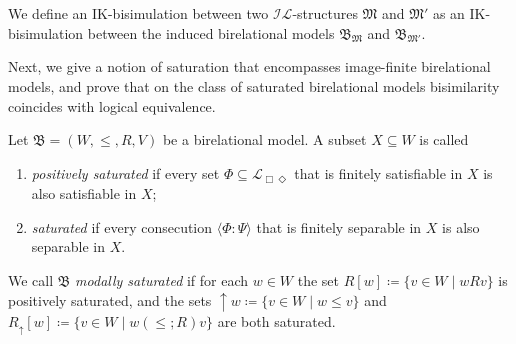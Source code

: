 \documentclass[submission,copyright,creativecommons]{eptcs}
\newcommand{\mo}{\mathfrak}
\newcommand{\B}{\mo{B}}
\newcommand{\ac}{R}
\newcommand{\IL}{\mathscr{I\!\!L}}   %
\newcommand{\ML}{\mathcal{L}_{\Box\Diamond}}        %
\newcommand{\consec}[2]{\langle #1:#2 \rangle}
\begin{document}
\begin{definition}
  We define an IK-bi\-si\-mu\-la\-tion between two $\IL$-structures $\mo{M}$ and $\mo{M}'$
  as an IK-bi\-si\-mu\-la\-tion between the induced birelational models $\B_{\mo{M}}$ and $\B_{\mo{M}'}$.
\end{definition}

  Next, we give a notion of saturation that encompasses image-finite birelational
  models, and prove that on the class of saturated birelational models
  bisimilarity coincides with logical equivalence.

\begin{definition}\label{def:mod-sat}
  Let $\B = (W, \leq, \ac, V)$ be a birelational model.
  A subset $X \subseteq W$ is called
  \begin{enumerate}
    \item \emph{positively saturated} if every set $\Phi \subseteq \ML$ that is finitely satisfiable in $X$ is also satisfiable in $X$;
    \item \emph{saturated} if every consecution $\consec{\Phi}{\Psi}$ that is finitely separable in $X$ is also separable in $X$. 
  \end{enumerate}
%
  We call $\B$
  \emph{modally saturated} if for each $w \in W$ the set
  $R[w] \coloneq \{ v \in W \mid wRv \}$ is positively saturated,
  and the sets ${\uparrow}w \coloneq \{ v \in W \mid w \leq v \}$
  and $R_{\uparrow}[w] \coloneq \{ v \in W \mid w ({\leq} \mathrel{;} R) v \}$
  are both saturated.
\end{definition}
\end{document}
